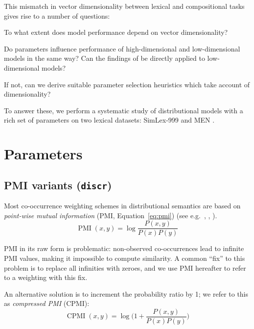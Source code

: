 \documentclass[11pt]{article}
\begin{document}
This mismatch in vector dimensionality between lexical and compositional tasks gives rise to a number of questions:
\begin{compactitem}
\item To what extent does model performance depend on vector dimensionality?
\item Do parameters influence performance of high-dimensional and low-dimensional models in the same way? Can the findings of  be directly applied to low-dimensional models?
\item If not, can we derive suitable parameter selection heuristics which take account of dimensionality?
\end{compactitem}

To answer these, we perform a systematic study of distributional models with a rich set of parameters on two lexical datasets: SimLex-999 \cite{hill2014simlex} and MEN \cite{Bruni:2014:MDS:2655713.2655714}.

\section{Parameters}
\label{sec:parameters}



\subsection{PMI variants (\texttt{discr})}
\label{sec:pmi-variants}

Most co-occurrence weighting schemes in distributional semantics are based on \emph{point-wise mutual information} (PMI, Equation~\ref{eq:pmi}) (see e.g.~, , ).
%
\begin{equation}
  \label{eq:pmi}
  \operatorname{PMI}(x, y) = \log\frac{P(x,y)}{P(x)P(y)}
\end{equation}

PMI in its raw form is problematic: non-observed co-occurrences lead to infinite PMI values, making it impossible to compute similarity. A common ``fix'' to this problem is to replace all infinities with zeroes, and we use PMI hereafter to refer to a weighting with this fix.

An alternative solution is to increment the probability ratio by 1; we refer to this as \textit{compressed PMI} (CPMI):
%
\begin{equation}
  \label{eq:cpmi}
  \operatorname{CPMI}(x, y) = \log\Big( 1 + \frac{P(x,y)}{P(x)P(y)} \Big)
\end{equation}
\end{document}
